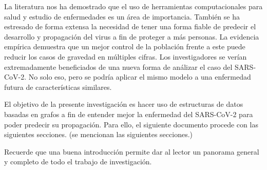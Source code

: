 \begin{tcolorbox}[colback=blue!5!white,colframe=blue!75!black,title=Ejemplo Movimiento 2]
  La literatura nos ha demostrado que el uso de herramientas computacionales para salud y estudio de enfermedades es un área de importancia. También se ha estresado de forma extensa la necesidad de tener una forma fiable de predecir el desarrollo y propagación del virus a fin de proteger a más personas. La evidencia empírica demuestra que un mejor control de la población frente a este puede reducir los casos de gravedad en múltiples cifras. Los investigadores se verían extremadamente beneficiados de una nueva forma de análizar el caso del SARS-CoV-2. No solo eso, pero se podría aplicar el mismo modelo a una enfermedad futura de características similares.
\end{tcolorbox}

\begin{tcolorbox}[colback=blue!5!white,colframe=blue!75!black,title=Ejemplo Movimiento 3]
  El objetivo de la presente investigación es hacer uso de estructuras de datos basadas en grafos a fin de entender mejor la enfermedad del SARS-CoV-2 para poder predecir su propagación. Para ello, el siguiente documento procede con las siguientes secciones. (se mencionan las siguientes secciones.)
\end{tcolorbox}

Recuerde que una buena introducción permite dar al lector un panorama general y completo de todo el trabajo de investigación.
